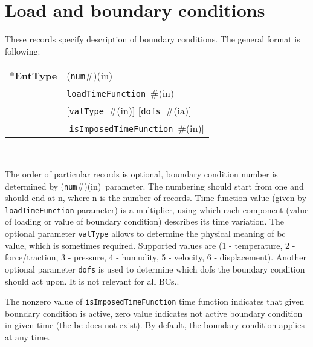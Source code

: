 \documentclass[a4paper]{report}
\newcommand{\param}[1]{\texttt{#1}} %
\newcommand{\optional}[1]{[#1]} %
\newcommand{\field}[2]{\param{#1}~\#{\tiny(#2)}} %
\newcommand{\optField}[2]{\optional{\field{#1}{#2}}}
\newcommand{\componentNum}{(\param{num}\#){\tiny(in)}} %
\newcommand{\entKeyword}[1]{*\textbf{#1}} %
\newenvironment{record}[1][]{\begin{tabular}{|ll}}{\end{tabular}\\}
\newcommand{\recentry}[2]{{#1}&{#2}\\}
\newcounter{rcc}
\newenvironment{record}[1][\textwidth]{\setcounter{rcc}{0}\rowcolors{1}{lightgray}{lightgray}\tabularx{#1}{llR} \hline}
               {\endtabularx}
\newcommand{\recentry}[2]{\ifthenelse{\value{rcc}>0}{$\backslash$ \\}{\setcounter{rcc}{1}}{#1}&{#2}&}
\begin{document}
\section{Load and boundary conditions}
\label{_LoadBoundaryInitialConditions}
These records specify description of  boundary conditions. The general format is
following:

\noindent
\begin{record}
  \recentry{\entKeyword{EntType}}{\componentNum}
  \recentry{}{\field{loadTimeFunction}{in}}
  \recentry{}{\optField{valType}{in} \optField{dofs}{ia}}
  \recentry{}{\optField{is\-Impo\-sed\-Ti\-me\-Fun\-ction}{in}}
\end{record}

The order of particular  records is optional, boundary condition number is determined by \componentNum\ parameter.
The numbering should start from one and should end at n, where n is the number of records.
Time function value (given by \param{loadTimeFunction} parameter) is a multiplier, using which
each  component (value of loading or value of boundary condition)
describes its time variation.
The optional parameter \param{valType} allows to determine the
physical meaning of bc value, which is sometimes required. Supported
values are (1 - temperature, 2 - force/traction,
3 - pressure, 4 - humudity, 5 - velocity, 6 - displacement).
Another optional parameter \param{dofs} is used to determine which dofs the boundary condition should act
upon. It is not relevant for all BCs..

The nonzero value of \param{isImposedTimeFunction} time function
indicates that given boundary condition is active, zero value
indicates not active boundary condition in given time (the bc does not
exist). By default, the boundary condition applies at any time.
\end{document}
